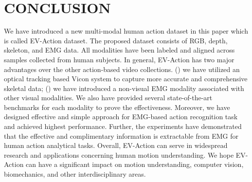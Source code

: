 \documentclass[a4paper, 10pt, conference]{ieeeconf}      \usepackage{FG2020}
\begin{document}
\section{CONCLUSION}
We have introduced a new multi-modal human action dataset in this paper which is called EV-Action dataset. The proposed dataset consists of RGB, depth, skeleton, and EMG data. All modalities have been labeled and aligned across  samples collected from  human subjects. In general, EV-Action has two major  advantages over the other action-based video collections. () we have utilized an optical tracking based Vicon system to capture more accurate and comprehensive skeletal data; () we have introduced a non-visual EMG modality associated with other visual modalities. We also have provided several state-of-the-art benchmarks for each modality to prove the effectiveness. Moreover, we have designed effective and simple approach for EMG-based action recognition task and achieved highest performance. Further, the experiments  have demonstrated that the effective and complimentary information is extractable from EMG for human action analytical tasks. Overall, EV-Action can serve in widespread research and applications concerning human motion understanding. We hope EV-Action can have a significant impact on motion understanding, computer vision, biomechanics, and other interdisciplinary areas.




\newpage                                  



\end{document}
